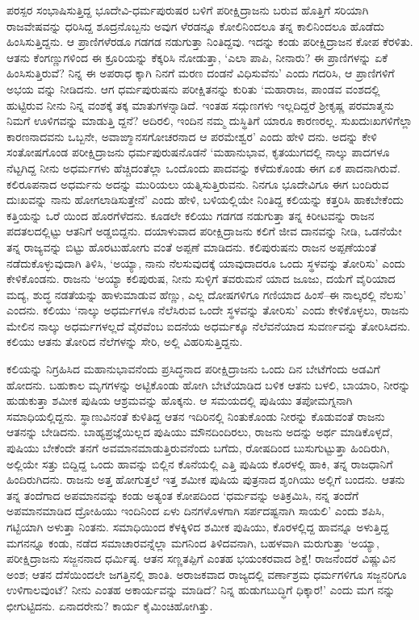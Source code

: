 ಪರಸ್ಪರ ಸಂಭಾಷಿಸುತ್ತಿದ್ದ ಭೂದೇವಿ-ಧರ್ಮಪುರುಷರ ಬಳಿಗೆ ಪರೀಕ್ಷಿದ್ರಾಜನು ಬರುವ ಹೊತ್ತಿಗೆ ಸರಿಯಾಗಿ ರಾಜವೇಷವನ್ನು ಧರಿಸಿದ್ದ ಶೂದ್ರನೊಬ್ಬನು ಅವುಗ ಳೆರಡನ್ನೂ ಕೋಲಿನಿಂದಲೂ ತನ್ನ ಕಾಲಿನಿಂದಲೂ ಹೊಡೆದು ಹಿಂಸಿಸುತ್ತಿದ್ದನು. ಆ ಪ್ರಾಣಿಗಳೆರಡೂ ಗಡಗಡ ನಡುಗುತ್ತಾ ನಿಂತಿದ್ದವು. ಇದನ್ನು ಕಂಡು ಪರೀಕ್ಷಿದ್ರಾಜನ ಕೋಪ ಕೆರಳಿತು. ಆತನು ಕೆಂಗಣ್ಣುಗಳಿಂದ ಈ ಕ್ರೂರಿಯನ್ನು ಕೆಕ್ಕರಿಸಿ ನೋಡುತ್ತಾ, ‘ಎಲಾ ಪಾಪಿ, ನೀನಾರು? ಈ ಪ್ರಾಣಿಗಳನ್ನು ಏಕೆ ಹಿಂಸಿಸುತ್ತಿರುವೆ? ನಿನ್ನ ಈ ಅಪರಾಧ ಕ್ಕಾಗಿ ನಿನಗೆ ಮರಣ ದಂಡನೆ ವಿಧಿಸುವೆನು’ ಎಂದು ಗದರಿಸಿ, ಆ ಪ್ರಾಣಿಗಳಿಗೆ ಅಭಯ ವನ್ನು ನೀಡಿದನು. ಆಗ ಧರ್ಮಪುರುಷನು ಪರೀಕ್ಷಿತನನ್ನು ಕುರಿತು ‘ಮಹಾರಾಜ, ಪಾಂಡವ ವಂಶದಲ್ಲಿ ಹುಟ್ಟಿರುವ ನೀನು ನಿನ್ನ ವಂಶಕ್ಕೆ ತಕ್ಕ ಮಾತುಗಳನ್ನಾಡಿದೆ. ಇಂತಹ ಸದ್ಗುಣಗಳು ಇಲ್ಲದಿದ್ದರೆ ಶ್ರೀಕೃಷ್ಣ ಪರಮಾತ್ಮನು ನಿಮಗೆ ಊಳಿಗವನ್ನು ಮಾಡುತ್ತಿ ದ್ದನೆ? ಅದಿರಲಿ, ಇಂದಿನ ನಮ್ಮ ದುಸ್ಥಿತಿಗೆ ಯಾರೂ ಕಾರಣರಲ್ಲ. ಸುಖದುಃಖಗಳಿಗೆಲ್ಲಾ ಕಾರಣನಾದವನು ಒಬ್ಬನೇ, ಅವಾಙ್ಮಾನಸಗೋಚರನಾದ ಆ ಪರಮೇಶ್ವರ’ ಎಂದು ಹೇಳಿ ದನು. ಅದನ್ನು ಕೇಳಿ ಸಂತೋಷಗೊಂಡ ಪರೀಕ್ಷಿದ್ರಾಜನು ಧರ್ಮಪುರುಷನೊಡನೆ ‘ಮಹಾನುಭಾವ, ಕೃತಯುಗದಲ್ಲಿ ನಾಲ್ಕು ಪಾದಗಳೂ ನೆಟ್ಟಗಿದ್ದ ನೀನು ಅಧರ್ಮಗಳು ಹೆಚ್ಚಿದಂತೆಲ್ಲಾ ಒಂದೊಂದು ಪಾದವನ್ನು ಕಳೆದುಕೊಂಡು ಈಗ ಏಕ ಪಾದನಾಗಿರುವೆ. ಕಲಿರೂಪನಾದ ಅಧರ್ಮನು ಅದನ್ನು ಮುರಿಯಲು ಯತ್ನಿಸುತ್ತಿರುವನು. ನಿನಗೂ ಭೂದೇವಿಗೂ ಈಗ ಬಂದಿರುವ ದುಃಖವನ್ನು ನಾನು ಹೋಗಲಾಡಿಸುತ್ತೇನೆ’ ಎಂದು ಹೇಳಿ, ಬಳಿಯಲ್ಲಿಯೇ ನಿಂತಿದ್ದ ಕಲಿಯನ್ನು ಕತ್ತರಿಸಿ ಹಾಕಬೇಕೆಂದು ಕತ್ತಿಯನ್ನು ಒರೆ ಯಿಂದ ಹೊರಗೆಳೆದನು. ಕೂಡಲೇ ಕಲಿಯು ಗಡಗಡ ನಡುಗುತ್ತಾ ತನ್ನ ಕಿರೀಟವನ್ನು ರಾಜನ ಪದತಲದಲ್ಲಿಟ್ಟು ಆತನಿಗೆ ಅಡ್ಡಬಿದ್ದನು. ದಯಾಳುವಾದ ಪರೀಕ್ಷಿದ್ರಾಜನು ಕಲಿಗೆ ಜೀವ ದಾನವನ್ನು ನೀಡಿ, ಒಡನೆಯೇ ತನ್ನ ರಾಜ್ಯವನ್ನು ಬಿಟ್ಟು ಹೊರಟುಹೋಗು ವಂತೆ ಅಪ್ಪಣೆ ಮಾಡಿದನು. ಕಲಿಪುರುಷನು ರಾಜನ ಅಪ್ಪಣೆಯಂತೆ ನಡೆದುಕೊಳ್ಳುವುದಾಗಿ ತಿಳಿಸಿ, ‘ಅಯ್ಯಾ, ನಾನು ನೆಲಸುವುದಕ್ಕೆ ಯಾವುದಾದರೂ ಒಂದು ಸ್ಥಳವನ್ನು ತೋರಿಸು’ ಎಂದು ಕೇಳಿಕೊಂಡನು. ರಾಜನು ‘ಅಯ್ಯಾ ಕಲಿಪುರುಷ, ನೀನು ಸುಳ್ಳಿಗೆ ತವರುಮನೆ ಯಾದ ಜೂಜು, ದಯೆಗೆ ವೈರಿಯಾದ ಮದ್ಯ, ಶುದ್ಧ ನಡತೆಯನ್ನು ಹಾಳುಮಾಡುವ ಹೆಣ್ಣು, ಎಲ್ಲ ದೋಷಗಳಿಗೂ ಗಣಿಯಾದ ಹಿಂಸೆ–ಈ ನಾಲ್ಕರಲ್ಲಿ ನೆಲಸು’ ಎಂದನು. ಕಲಿಯು ‘ನಾಲ್ಕು ಅಧರ್ಮಗಳೂ ನೆಲೆಸಿರುವ ಒಂದೇ ಸ್ಥಳವನ್ನು ತೋರಿಸು’ ಎಂದು ಕೇಳಿಕೊಳ್ಳಲು, ರಾಜನು ಮೇಲಿನ ನಾಲ್ಕು ಅಧರ್ಮಗಳಲ್ಲದೆ ವೈರವೆಂಬ ಐದನೆಯ ಅಧರ್ಮಕ್ಕೂ ನೆಲೆವನೆಯಾದ ಸುವರ್ಣವನ್ನು ತೋರಿಸಿದನು. ಕಲಿಯು ಆತನು ತೋರಿದ ನೆಲೆಗಳನ್ನು ಸೇರಿ, ಅಲ್ಲಿ ವಿಹರಿಸುತ್ತಿದ್ದನು.

ಕಲಿಯನ್ನು ನಿಗ್ರಹಿಸಿದ ಮಹಾನುಭಾವನೆಂದು ಪ್ರಸಿದ್ಧನಾದ ಪರೀಕ್ಷಿದ್ರಾಜನು ಒಂದು ದಿನ ಬೇಟೆಗೆಂದು ಅಡವಿಗೆ ಹೋದನು. ಬಹುಕಾಲ ಮೃಗಗಳನ್ನು ಅಟ್ಟಿಕೊಂಡು ಹೋಗಿ ಬೇಟೆಯಾಡಿದ ಬಳಿಕ ಆತನು ಬಳಲಿ, ಬಾಯಾರಿ, ನೀರನ್ನು ಹುಡುಕುತ್ತಾ ಶಮೀಕ ಪುಷಿಯ ಆಶ್ರಮವನ್ನು ಹೊಕ್ಕನು. ಆ ಸಮಯದಲ್ಲಿ ಪುಷಿಯು ತಪೋಮಗ್ನನಾಗಿ ಸಮಾಧಿಯಲ್ಲಿದ್ದನು. ಸ್ಥಾಣುವಿನಂತೆ ಕುಳಿತಿದ್ದ ಆತನ ಇದಿರಿನಲ್ಲಿ ನಿಂತುಕೊಂಡು ನೀರನ್ನು ಕೊಡುವಂತೆ ರಾಜನು ಆತನನ್ನು ಬೇಡಿದನು. ಬಾಹ್ಯಪ್ರಜ್ಞೆಯಿಲ್ಲದ ಪುಷಿಯು ಮೌನದಿಂದಿರಲು, ರಾಜನು ಅದನ್ನು ಅರ್ಥ ಮಾಡಿಕೊಳ್ಳದೆ, ಪುಷಿಯು ಬೇಕೆಂದೇ ತನಗೆ ಅವಮಾನಮಾಡುತ್ತಿರುವನೆಂದು ಬಗೆದು, ರೋಷದಿಂದ ಬುಸುಗುಟ್ಟುತ್ತಾ ಹಿಂದಿರುಗಿ, ಅಲ್ಲಿಯೇ ಸತ್ತು ಬಿದ್ದಿದ್ದ ಒಂದು ಹಾವನ್ನು ಬಿಲ್ಲಿನ ಕೊನೆಯಲ್ಲಿ ಎತ್ತಿ ಪುಷಿಯ ಕೊರಳಲ್ಲಿ ಹಾಕಿ, ತನ್ನ ರಾಜಧಾನಿಗೆ ಹಿಂದಿರುಗಿದನು. ರಾಜನು ಅತ್ತ ಹೋಗುತ್ತಲೆ ಇತ್ತ ಶಮೀಕ ಪುಷಿಯ ಪುತ್ರನಾದ ಶೃಂಗಿಯು ಅಲ್ಲಿಗೆ ಬಂದನು. ಆತನು ತನ್ನ ತಂದೆಗಾದ ಅಪಮಾನವನ್ನು ಕಂಡು ಅತ್ಯಂತ ಕೋಪದಿಂದ ‘ಧರ್ಮವನ್ನು ಅತಿಕ್ರಮಿಸಿ, ನನ್ನ ತಂದೆಗೆ ಅಪಮಾನಮಾಡಿದ ದ್ರೋಹಿಯು ಇಂದಿನಿಂದ ಏಳು ದಿನಗಳೊಳಗಾಗಿ ಸರ್ಪದಷ್ಟನಾಗಿ ಸಾಯಲಿ’ ಎಂದು ಶಪಿಸಿ, ಗಟ್ಟಿಯಾಗಿ ಅಳುತ್ತಾ ನಿಂತನು. ಸಮಾಧಿಯಿಂದ ಕೆಳಕ್ಕಿಳಿದ ಶಮೀಕ ಪುಷಿಯು, ಕೊರಳಲ್ಲಿದ್ದ ಹಾವನ್ನೂ ಅಳುತ್ತಿದ್ದ ಮಗನನ್ನೂ ಕಂಡು, ನಡೆದ ಸಮಾಚಾರವನ್ನೆಲ್ಲಾ ಮಗನಿಂದ ತಿಳಿದವನಾಗಿ, ಬಹಳವಾಗಿ ಮರುಗುತ್ತಾ ‘ಅಯ್ಯಾ, ಪರೀಕ್ಷಿದ್ರಾಜನು ಸಜ್ಜನನಾದ ಧರ್ಮಿಷ್ಠ. ಆತನ ಸಣ್ಣತಪ್ಪಿಗೆ ಎಂತಹ ಭಯಂಕರವಾದ ಶಿಕ್ಷೆ! ರಾಜನೆಂದರೆ ವಿಷ್ಣುವಿನ ಅಂಶ; ಆತನ ದೆಸೆಯಿಂದಲೇ ಜಗತ್ತಿನಲ್ಲಿ ಶಾಂತಿ. ಅರಾಜಕವಾದ ರಾಜ್ಯದಲ್ಲಿ ವರ್ಣಾಶ್ರಮ ಧರ್ಮಗಳಿಗೂ ಸಜ್ಜನರಿಗೂ ಉಳಿಗಾಲವುಂಟೆ? ನೀನು ಎಂತಹ ಅಕಾರ್ಯವನ್ನು ಮಾಡಿದೆ? ನಿನ್ನ ಹುಡುಗಬುದ್ಧಿಗೆ ಧಿಕ್ಕಾರ!’ ಎಂದು ಮಗ ನನ್ನು ಛೀಗುಟ್ಟಿದನು. ಏನಾದರೇನು? ಕಾರ್ಯ ಕೈಮಿಂಚಿಹೋಗಿತ್ತು.

